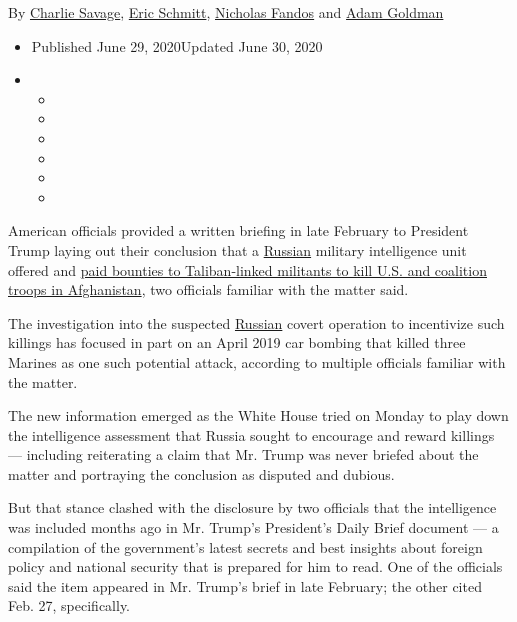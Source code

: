 By \href{https://www.nytimes.com/by/charlie-savage}{Charlie Savage},
\href{https://www.nytimes.com/by/eric-schmitt}{Eric Schmitt},
\href{https://www.nytimes.com/by/nicholas-fandos}{Nicholas Fandos} and
\href{https://www.nytimes.com/by/adam-goldman}{Adam Goldman}

\begin{itemize}
\item
  Published June 29, 2020Updated June 30, 2020
\item
  \begin{itemize}
  \item
  \item
  \item
  \item
  \item
  \item
  \end{itemize}
\end{itemize}

American officials provided a written briefing in late February to
President Trump laying out their conclusion that a
\href{https://www.nytimes.com/2020/06/30/us/politics/russian-bounties-afghanistan-intelligence.html}{Russian}
military intelligence unit offered and
\href{https://www.nytimes.com/2020/06/30/us/politics/russian-bounties-afghanistan-intelligence.html}{paid
bounties to Taliban-linked militants to kill U.S. and coalition troops
in Afghanistan}, two officials familiar with the matter said.

The investigation into the suspected
\href{https://www.nytimes.com/2020/07/01/us/politics/trump-putin-russia-taliban-bounty.html}{Russian}
covert operation to incentivize such killings has focused in part on an
April 2019 car bombing that killed three Marines as one such potential
attack, according to multiple officials familiar with the matter.

The new information emerged as the White House tried on Monday to play
down the intelligence assessment that Russia sought to encourage and
reward killings --- including reiterating a claim that Mr. Trump was
never briefed about the matter and portraying the conclusion as disputed
and dubious.

But that stance clashed with the disclosure by two officials that the
intelligence was included months ago in Mr. Trump's President's Daily
Brief document --- a compilation of the government's latest secrets and
best insights about foreign policy and national security that is
prepared for him to read. One of the officials said the item appeared in
Mr. Trump's brief in late February; the other cited Feb. 27,
specifically.

